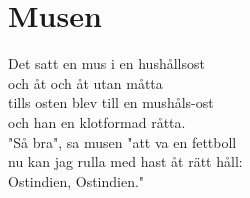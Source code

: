 \section{Musen}
Det satt en mus i en hushållsost\\
och åt och åt utan måtta\\
tills osten blev till en mushåls-ost\\
och han en klotformad råtta.\\
"Så bra", sa musen "att va en fettboll\\
nu kan jag rulla med hast åt rätt håll:\\
Ostindien, Ostindien."\\